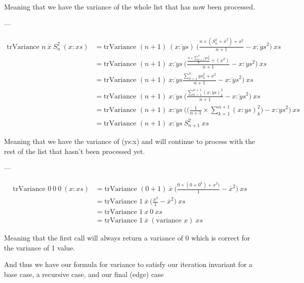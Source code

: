 \documentclass{article}
\begin{document}
Meaning that we have the variance of the whole list that has now been processed.

---

$$
\begin{aligned}
        \text{trVariance } n \ \overline{x} \ S^2_n \ (x:xs) & = \text{trVariance } (n + 1) \ (\overline{x:ys}) \ \Big(\frac{n \times (S^2_n + \overline{x}^2) + x^2}{n + 1} - \overline{x:ys}^2\Big) \ xs\\
        & = \text{trVariance } (n + 1) \ \overline{x:ys} \ \Big(\frac{\frac{n \times \sum_{k=1}^n ys_k^2}{n} + (x^2)}{n + 1} - \overline{x:ys}^2\Big) \ xs\\
        & = \text{trVariance } (n + 1) \ \overline{x:ys} \frac{\sum_{k=1}^n ys_k^2 + x^2}{n + 1} - \overline{x:ys}^2\Big) \ xs\\
        & = \text{trVariance } (n + 1) \ \overline{x:ys} \ \Big(\frac{\sum^{n+1}_{k=1}(x:ys)_k^2}{n + 1} - \overline{x:ys}^2 \Big) \ xs\\
        & = \text{trVariance } (n + 1) \ \overline{x:ys} \ \Bigg(\Big(\frac{1}{n + 1} \times \sum_{k=1}^{n+1} (x:ys)_k^2\Big) - \overline{x:ys}^2 \Bigg) \ xs\\
        & = \text{trVariance } (n + 1) \ \overline{x:ys} \ S^2_{n+1} \ xs
\end{aligned}
$$

Meaning that we have the variance of (ys:x) and will continue to process with the rest of the list that hasn't been processed yet.

---

$$
\begin{aligned}
        \text{trVariance } 0\ 0\ 0\ (x:xs) & = \text{trVariance } (0 + 1)\ \overline{x}\ \Big(\frac{0 \times (0 + 0^2) + x^2)}{1} - \overline{x}^2\Big)\ xs \\
        & = \text{trVariance } 1\ \overline{x}\ \Big(\frac{x^2}{1} - \overline{x}^2\Big)\ xs\\
        & = \text{trVariance } 1\ x\ 0\ xs\\
        & = \text{trVariance } 1\ \overline{x}\ (\text{variance } x)\ xs
\end{aligned}
$$

Meaning that the first call will always return a variance of 0 which is correct for the variance of 1 value.

And thus we have our formula for variance to satisfy our iteration invariant for a base case, a recursive case, and our final (edge) case

\clearpage
\end{document}
